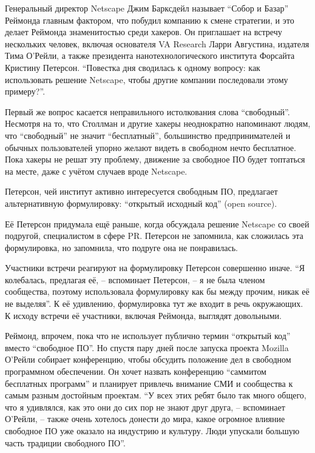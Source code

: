 Генеральный директор Netscape Джим Барксдейл называет ``Собор и Базар'' Реймонда главным фактором, что побудил компанию к смене стратегии, и это делает Реймонда знаменитостью среди хакеров. Он приглашает на встречу нескольких человек, включая основателя VA Research Ларри Августина, издателя Тима О'Рейли, а также президента нанотехнологического института Форсайта Кристину Петерсон. ``Повестка дня сводилась к одному вопросу: как использовать решение Netscape, чтобы другие компании последовали этому примеру?''.

Первый же вопрос касается неправильного истолкования слова ``свободный''. Несмотря на то, что Столлман и другие хакеры неоднократно напоминают людям, что ``свободный'' не значит ``бесплатный'', большинство предпринимателей и обычных пользователей упорно желают видеть в свободном нечто бесплатное. Пока хакеры не решат эту проблему, движение за свободное ПО будет топтаться на месте, даже с учётом случаев вроде Netscape.

Петерсон, чей институт активно интересуется свободным ПО, предлагает альтернативную формулировку: ``открытый исходный код'' (open source).

Её Петерсон придумала ещё раньше, когда обсуждала решение Netscape со своей подругой, специалистом в сфере PR. Петерсон не запомнила, как сложилась эта формулировка, но запомнила, что подруге она не понравилась. 

Участники встречи реагируют на формулировку Петерсон совершенно иначе. ``Я колебалась, предлагая её, -- вспоминает Петерсон, -- я не была членом сообщества, поэтому использовала формулировку как бы между прочим, никак её не выделяя''. К её удивлению, формулировка тут же входит в речь окружающих. К исходу встречи её участники, включая Реймонда, выглядят довольными.

Реймонд, впрочем, пока что не использует публично термин ``открытый код'' вместо ``свободное ПО''. Но спустя пару дней после запуска проекта Mozilla О'Рейли собирает конференцию, чтобы обсудить положение дел в свободном программном обеспечении. Он хочет назвать конференцию ``саммитом бесплатных программ'' и планирует привлечь внимание СМИ и сообщества к самым разным достойным проектам. ``У всех этих ребят было так много общего, что я удивлялся, как это они до сих пор не знают друг друга, -- вспоминает О'Рейли, -- также очень хотелось донести до мира, какое огромное влияние свободное ПО уже оказало на индустрию и культуру. Люди упускали большую часть традиции свободного ПО''.


